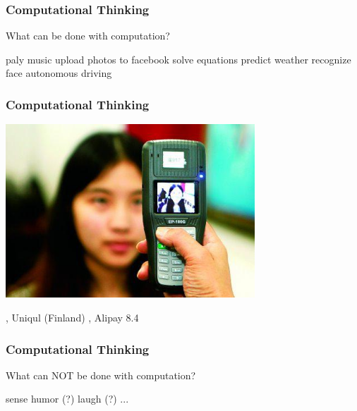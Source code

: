 \documentclass[11pt]{beamer}
\begin{document}
\begin{frame}
	\frametitle{Computational Thinking}
	\Enlarge
	\begin{itemize}
		\myitem What can be done with computation? \pause
		\begin{itemize}
	  		\mysubitem paly music \pause
			\mysubitem upload photos to facebook \pause
			\mysubitem solve equations \pause
			\mysubitem predict weather \pause
            \mysubitem recognize face \pause
			\mysubitem autonomous driving
		\end{itemize}
	\end{itemize}
\end{frame}



\begin{frame}
	\frametitle{Computational Thinking}
	\Enlarge
	\hspace{5mm} \includegraphics[width=0.7\textwidth]{./img/facepay.jpg}\\ \pause
	\begin{itemize}
	  		, Uniqul (Finland)
			, Alipay 8.4
	\end{itemize}
\end{frame}


\begin{frame}
	\frametitle{Computational Thinking}
	\Enlarge
	\begin{itemize}
		\myitem What can NOT be done with computation? \pause
        \begin{itemize}
    		\mysubitem sense humor (?)\pause
            \mysubitem laugh (?)
            \mysubitem ...
        \end{itemize}
	\end{itemize}
	
\end{frame}
\end{document}
